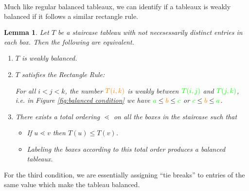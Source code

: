 \documentclass{article}
\newtheorem{lemma}[theorem]{Lemma}
\theoremstyle{definition}
\begin{document}
Much like regular balanced tableaux, we can identify if a tableaux is weakly balanced if it follows a similar rectangle rule.

\begin{lemma}
\label{lemma:balanced}
    Let $T$ be a staircase tableau with not necesessarily distinct entries in each box. Then the following are equivalent.
    \begin{enumerate}
        \item $T$ is weakly balanced.
        \item $T$ satisfies the \emph{Rectangle Rule:} 
        
        For all $i<j<k$, the number $\textcolor{orange}{T(i,k)}$ is weakly between $\textcolor{green}{T(i,j)}$ and $\textcolor{green}{T(j,k)}$, i.e. in Figure \ref{fig:balanced condition} we have $\textcolor{green}{a} \leq \textcolor{orange}{b} \leq \textcolor{green}{c}$ 
   or $\textcolor{green}{c} \leq \textcolor{orange}{b} \leq \textcolor{green}{a}$.
    \item There exists a total ordering $\lessdot$ on all the boxes in the staircase such that 
\begin{itemize}
    \item If $u \lessdot v$ then $T(u) \leq T(v)$.
    \item Labeling the boxes according to this total order produces a balanced tableaux. 
\end{itemize}
    \end{enumerate}
\end{lemma}

For the third condition, we are essentially assigning ``tie breaks'' to entries of the same value which make the tableau balanced. 
\end{document}
